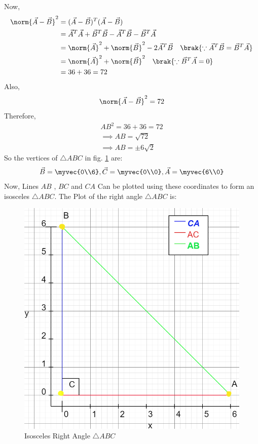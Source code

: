 \documentclass[journal,12pt,twocolumn]{IEEEtran}
\begin{document}
Now,
\begin{align}
\norm{\vec{A}-\vec{B}}^2 &= ({\vec{A}-\vec{B}})^T({\vec{A}-\vec{B}})
\\
&= \vec{A}^T\vec{A}+\vec{B}^T\vec{B}-\vec{A}^T\vec{B} - \vec{B}^T\vec{A}
\\
&= \norm{\vec{A}}^2 + \norm{\vec{B}}^2 - 2\vec{A}^T\vec{B} \quad \brak{\because \vec{A}^T\vec{B} = \vec{B}^T\vec{A} } 
\\
&= \norm{\vec{A}}^2 + \norm{\vec{B}}^2  \quad \brak{\because \vec{B}^T\vec{A}=0}
\\
&= 36+36=72
\end{align}
Also,
\begin{align}
\norm{{\vec{A}-\vec{B}}}^2=72
\end{align}
Therefore,
\begin{align}
AB^2=
36+36=72
\\
\implies AB=\sqrt{72}
\\
\implies AB=\pm 6\sqrt{2}
\end{align}
So the vertices of $\triangle ABC$ in fig. \ref{fig:right_angle_triangle} are: 
\begin{align}
\vec{B} = \myvec{0\\6}, \vec{C} = \myvec{0\\0}, \vec{A} = \myvec{6\\0}
\end{align}
Now, Lines $AB$ , $BC$ and $CA$ Can be plotted
using these coordinates to form an isosceles $\triangle ABC$.
The Plot of the right angle $\triangle ABC$ is:
\begin{figure}[!ht]
\centering
\includegraphics[width=\columnwidth]{diagram-1.png}
\caption{Isosceles Right Angle $\triangle ABC$}

\label{fig:right_angle_triangle}	
\end{figure}
\end{document}
